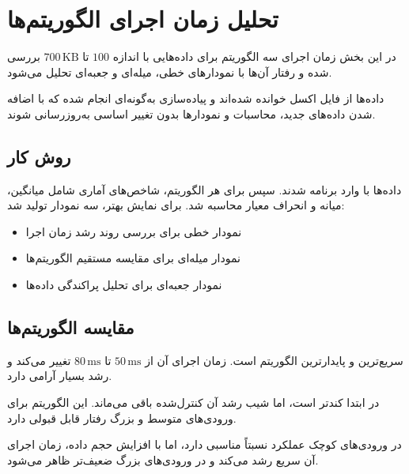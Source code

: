\documentclass[12pt,a4paper]{article}
\begin{document}
	\newpage
	
	\section{تحلیل زمان اجرای الگوریتم‌ها}
	
	\begin{summarybox}
		در این بخش زمان اجرای سه الگوریتم برای داده‌هایی با اندازه
		$100$
		تا
		$700\,\text{KB}$
		بررسی شده و رفتار آن‌ها با نمودارهای خطی، میله‌ای و جعبه‌ای تحلیل می‌شود.
	\end{summarybox}
	
	داده‌ها از فایل اکسل خوانده شده‌اند و پیاده‌سازی به‌گونه‌ای انجام شده که با اضافه شدن داده‌های جدید، محاسبات و نمودارها بدون تغییر اساسی به‌روزرسانی شوند.
	
	\subsection{روش کار}
	
	داده‌ها با
	وارد برنامه شدند. سپس برای هر الگوریتم، شاخص‌های آماری شامل میانگین، میانه و انحراف معیار محاسبه شد. برای نمایش بهتر، سه نمودار تولید شد:
	
	\begin{itemize}
		\item نمودار خطی برای بررسی روند رشد زمان اجرا
		\item نمودار میله‌ای برای مقایسه مستقیم الگوریتم‌ها
		\item نمودار جعبه‌ای برای تحلیل پراکندگی داده‌ها
	\end{itemize}
	
	\subsection{مقایسه الگوریتم‌ها}
	
	\begin{resultbox}
		\textbf{} سریع‌ترین و پایدارترین الگوریتم است. زمان اجرای آن از
		$50\,\text{ms}$
		تا
		$80\,\text{ms}$
		تغییر می‌کند و رشد بسیار آرامی دارد.
	\end{resultbox}
	
	\begin{resultbox}
		\textbf{} در ابتدا کندتر است، اما شیب رشد آن کنترل‌شده باقی می‌ماند. این الگوریتم برای ورودی‌های متوسط و بزرگ رفتار قابل قبولی دارد.
	\end{resultbox}
	
	\begin{resultbox}
		\textbf{} در ورودی‌های کوچک عملکرد نسبتاً مناسبی دارد، اما با افزایش حجم داده، زمان اجرای آن سریع رشد می‌کند و در ورودی‌های بزرگ ضعیف‌تر ظاهر می‌شود.
	\end{resultbox}
	
\end{document}
